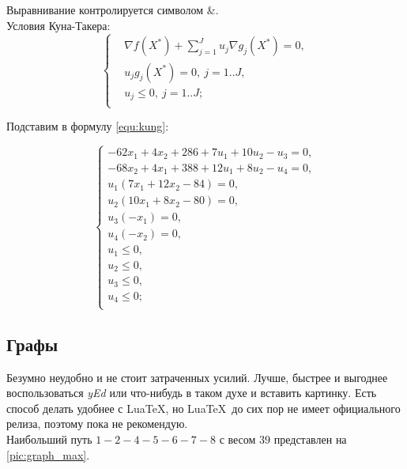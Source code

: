 Выравнивание контролируется символом \&. \\

Условия Куна-Такера:
\begin{equation}
	\left\{\begin{aligned}
		&\nabla f(X^*)+\sum_{j=1}^{J} u_j \nabla g_j(X^*)=0,\\
		&u_j g_j(X^*)=0,~ j=1..J,\\
		&u_j \leq 0,~ j=1..J;\\
	\end{aligned}\right.
	\label{equ:kung}
\end{equation}

Подставим в формулу \vref{equ:kung}:

\begin{equation}
	\left\{\begin{aligned}
		-62x_1+4x_2+286+7u_1+10u_2-u_3=0,\\
		-68x_2+4x_1+388+12u_1+8u_2-u_4=0,\\
		u_1(7x_1+12x_2-84)=0,\\
		u_2(10x_1+8x_2-80)=0,\\
		u_3(-x_1)=0,\\
		u_4(-x_2)=0,\\
		u_1\leq 0,\\
		u_2\leq 0,\\
		u_3\leq 0,\\
		u_4\leq 0;\\
	\end{aligned}\right.
\end{equation}

\subsection{Графы}

Безумно неудобно и не стоит затраченных усилий. Лучше, быстрее и выгоднее воспользоваться \emph{yEd} или что-нибудь в таком духе и вставить картинку. Есть способ делать удобнее с Lua\TeX, но Lua\TeX~до сих пор не имеет официального релиза, поэтому пока не рекомендую. \\

Наибольший путь $1-2-4-5-6-7-8$ с весом $39$ представлен на \vref{pic:graph_max}.

